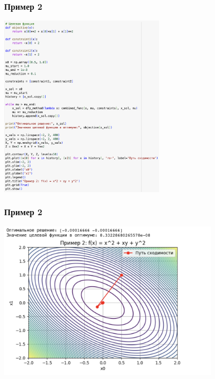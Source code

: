 \documentclass[12pt,pdf,hyperref={unicode}]{beamer}
\begin{document}
\begin{frame}
\frametitle{Пример 2}
\begin{center}
    \includegraphics[width=0.6\textwidth]{image7.png}
\end{center}
\end{frame}

\begin{frame}
\frametitle{Пример 2}
\begin{center}
    \includegraphics[width=0.8\textwidth]{image8.png}
\end{center}
\end{frame}
\end{document}
